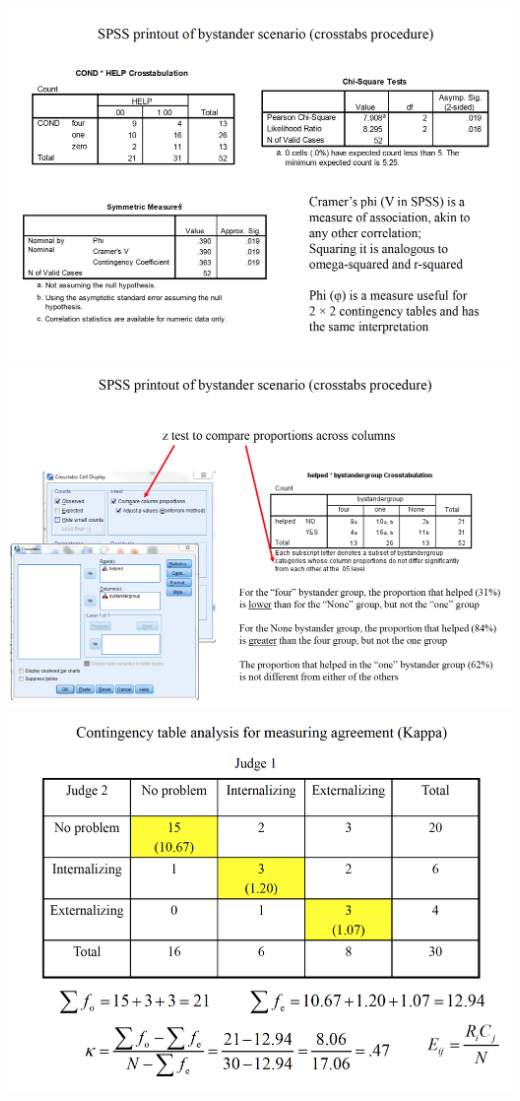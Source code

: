 \documentclass[]{book}
\theoremstyle{definition}
\theoremstyle{definition}
\theoremstyle{definition}
\theoremstyle{remark}
\begin{document}
\includegraphics{img/hickscs9.png} \includegraphics{img/hickscs10.png}
\includegraphics{img/hickscs11.png}
\end{document}
